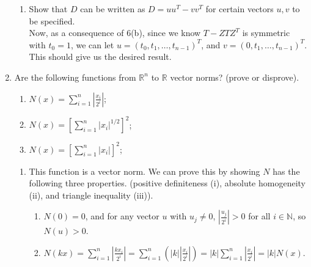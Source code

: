 \documentclass[11pt]{article}
\newcommand{\R}{\mathbb{R}}
\newcommand{\N}{\mathbb{N}}
\newcommand{\n}{\vspace{0.2cm}}
\begin{document}
\begin{enumerate}
\begin{enumerate}[label=(\alph*)]
		      \item Show that \(D\) can be written as \(D = uu^T - vv^T\) for certain vectors \(u,v\) to be specified. \n\\
		            Now, as a consequence of 6(b), since we know \(T - ZTZ^T\) is symmetric with \(t_0 = 1\), we can let \(u = (t_0, t_1, \hdots, t_{n-1})^T\), and \(v = (0, t_1, \hdots, t_{n-1})^T\).  This should give us the desired result.
	      \end{enumerate}

	\item Are the following functions from \(\R^n\) to \(\R\) vector norms? (prove or disprove).
	      \begin{multicols}{3}
		      \begin{enumerate}[label=(\alph*)]
			      \item \(N(x) = \displaystyle\sum_{i=1}^n \left| \frac{x_i}{2^i} \right|\);
			      \item \(N(x) = \left[ \displaystyle\sum_{i=1}^n |x_i|^{1/2} \right]^2\);
			      \item \(N(x) = \left[ \displaystyle\sum_{i=1}^n |x_i| \right]^2\);
		      \end{enumerate}
	      \end{multicols}
	      \begin{enumerate}[label=(\alph*)]
		      \item This function is a vector norm.  We can prove this by showing \(N\) has the following three properties. (positive definiteness (i), absolute homogeneity (ii), and triangle inequality (iii)).
		            \begin{enumerate}
			            \item \(N(0)=0\), and for any vector \(u\) with \(u_j \neq 0\), \(\left| \displaystyle\frac{u_j}{2^i} \right| > 0\) for all \(i \in \N\), so \(N(u) > 0\).

			            \item \(N(kx) = \displaystyle\sum_{i=1}^{n} \left| \frac{kx_i}{2^i} \right| = \sum_{i=1}^n \left(|k|\left| \frac{x_i}{2^i} \right|\right) = |k| \sum_{i=1}^n \left| \frac{x_i}{2^i} \right| = |k|N(x)\).


\end{enumerate}
\end{enumerate}
\end{enumerate}
\end{document}

